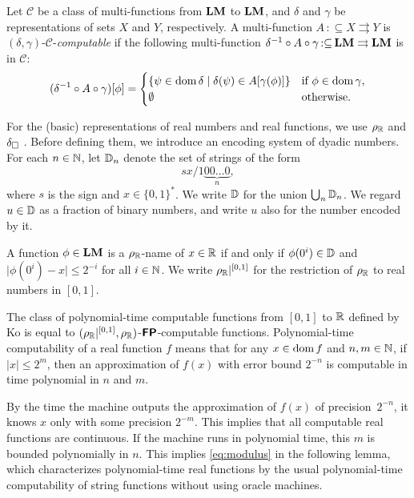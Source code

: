 \documentclass[envcountsame,orivec,oribibl]{llncs}
\newcommand{\pcolon}{\mathpunct{\,:\subseteq}}
\begin{document}
Let $\mathcal C$ be a class of multi-functions from $\mathbf{LM}$ to $\mathbf{LM}$,
and $\delta$ and $\gamma$ be representations of sets $X$ and $Y$, respectively.
A multi-function $A \pcolon X \rightrightarrows Y$
is $(\delta, \gamma)$-$\mathcal C$-\emph{computable} if 
the following multi-function $\delta^{-1} \circ A \circ \gamma \pcolon \LM \rightrightarrows \LM$ is in $\mathcal C$: 
\begin{equation}
 (\delta^{-1} \circ A \circ \gamma)[\phi] = 
  \begin{cases}
   \{\psi \in \mathop{\rm dom} \delta \mid \delta(\psi) \in A[\gamma(\phi)] \}
   & 
   \text{if } \phi \in \mathop{\rm dom} \gamma, 
   \\ 
   \emptyset 
   &
   \text{otherwise.}
  \end{cases}
\end{equation}


For the (basic) representations of real numbers and real functions,
we use $\rho _\mathbb R$ and $\delta _\square$ \cite{kawamura2012complexity}.
Before defining them, we introduce an encoding system of dyadic numbers.
For each $n \in \mathbb N$, let $\mathbb D_n$ denote the set of strings of the form
\begin{equation}
 sx/1\!\underbrace{00\dots0}_{n},
\end{equation}
where $s$ is the sign and $x \in \{0,1\}^*$.
We write $\mathbb D$ for the union $\bigcup _n \mathbb D _n$.
We regard $u \in \mathbb D$ as a fraction of binary numbers, 
and write $u$ also for the number encoded by it.

A function $\phi \in \mathbf{LM}$ is a $\rho _\mathbb R$-name of $x \in \mathbb R$ 
if and only if $\phi(0^i) \in \mathbb D$ and $\lvert \phi(0^i) - x \rvert \le 2^{-i}$
for all $i \in \mathbb N$.
We write $\rho _\mathbb R|^{[0,1]}$ for the restriction of $\rho _\mathbb R$ to real numbers in $[0,1]$.

The class of polynomial-time computable functions from $[0,1]$ to $\mathbb R$ 
defined by Ko is equal to
$(\rho _\mathbb R|^{[0,1]},\rho _\mathbb R)$-$\text{\bfseries \sffamily \upshape FP}$-computable functions.
Polynomial-time computability of a real function $f$ means that
for any $x \in \mathop{\rm dom} f$ and $n,m \in \mathbb N$, 
if $|x| \le 2^m$, then
an approximation of $f(x)$ with error bound $2^{-n}$
is computable in time polynomial in $n$ and $m$.

By the time the machine outputs the approximation of $f (x)$ of precision~$2 ^{-n}$, 
it knows $x$ only with some precision $2 ^{-m}$.
This implies that all computable real functions are continuous.
If the machine runs in polynomial time,
this $m$ is bounded polynomially in $n$.
This implies \eqref{eq:modulus} in the following lemma, 
which characterizes polynomial-time real functions
by the usual polynomial-time computability of string functions 
without using oracle machines. 
\end{document}
